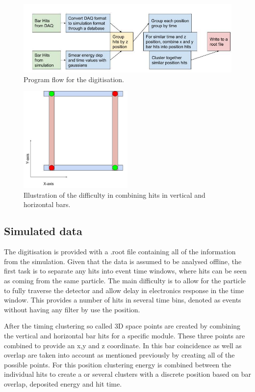 \begin{figure}[h!]
\centering
\includegraphics[width=\textwidth]{figures/Digitisation.jpg}
\caption{Program flow for the digitisation.}
\label{fig:digi}
\end{figure}

\begin{figure}[h!]
\centering
\includegraphics[width=0.5\textwidth]{figures/BarsAmbi.jpg}
\caption{Illustration of the difficulty in combining hits in vertical and horizontal bars.}
\label{fig:BarAmbi}
\end{figure}

\subsection{Simulated data}

The digitisation is provided with a .root file containing all of the information from the simulation. Given that the data is assumed to be analysed offline, the first task is to separate any hits into event time windows, where hits can be seen as coming from the same particle. The main difficulty is to allow for the particle to fully traverse the detector and allow delay in electronics response in the time window. This provides a number of hits in several time bins, denoted as events without having any filter by use the position.

After the timing clustering so called 3D space points are created by combining the vertical and horizontal bar hits for a specific module. These three points are combined to provide an x,y and z coordinate. In this bar coincidence as well as overlap are taken into account as mentioned previously by creating all of the possible points. For this position clustering energy is combined between the individual hits to create a or several clusters with a discrete position based on bar overlap, deposited energy and hit time.

